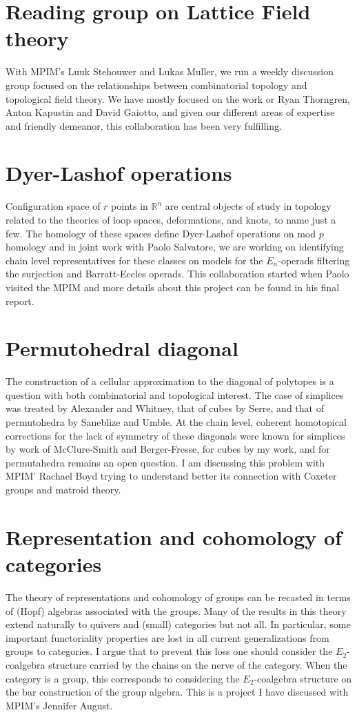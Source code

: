 \documentclass{amsart}
\theoremstyle{definition}
\begin{document}
	\section{Reading group on Lattice Field theory}
	With MPIM's Luuk Stehouwer and Lukas Muller, we run a weekly discussion group focused on the relationships between combinatorial topology and topological field theory.
	We have mostly focused on the work or Ryan Thorngren, Anton Kapustin and David Gaiotto, and given our different areas of expertise and friendly demeanor, this collaboration has been very fulfilling.
	
	\section{Dyer-Lashof operations}
	Configuration space of $r$ points in $\mathbb R^n$ are central objects of study in topology related to the theories of loop spaces, deformations, and knots, to name just a few.
	The homology of these spaces define Dyer-Lashof operations on mod $p$ homology and in joint work with Paolo Salvatore, we are working on identifying chain level representatives for these classes on models for the $E_n$-operads filtering the surjection and Barratt-Eccles operads.
	This collaboration started when Paolo visited the MPIM and more details about this project can be found in his final report.
	
	\section{Permutohedral diagonal}
	The construction of a cellular approximation to the diagonal of polytopes is a question with both combinatorial and topological interest.
	The case of simplices was treated by Alexander and Whitney, that of cubes by Serre, and that of permutohedra by Saneblize and Umble.
	At the chain level, coherent homotopical corrections for the lack of symmetry of these diagonals were known for simplices by work of McClure-Smith and Berger-Fresse, for cubes by my work, and for permutahedra remains an open question.
	I am discussing this problem with MPIM' Rachael Boyd trying to understand better its connection with Coxeter groups and matroid theory.
	
	\section{Representation and cohomology of categories}
	The theory of representations and cohomology of groups can be recasted in terms of (Hopf) algebras associated with the groups. Many of the results in this theory extend naturally to quivers and (small) categories but not all. In particular, some important functoriality properties are lost in all current generalizations from groups to categories.
	I argue that to prevent this loss one should consider the $E_2$-coalgebra structure carried by the chains on the nerve of the category.
	When the category is a group, this corresponds to considering the $E_2$-coalgebra structure on the bar construction of the group algebra.
	This is a project I have discussed with MPIM's Jennifer August.	
	
		
\end{document}
